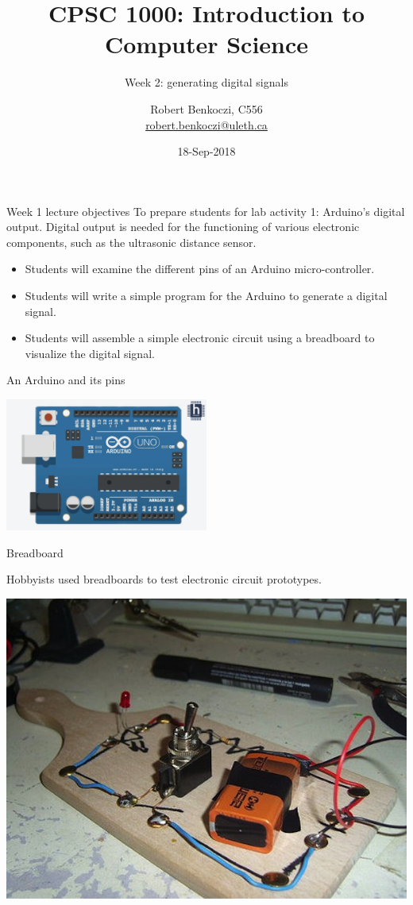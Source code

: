 \documentclass[aspectratio=1610]{beamer}
\title %
{CPSC 1000: Introduction to Computer Science}
\subtitle{Week 2: generating digital signals} %
\author{Robert Benkoczi, C556\\\url{robert.benkoczi@uleth.ca}}
\date{18-Sep-2018}
\begin{document}
\begin{frame}[plain]
\titlepage
\end{frame}


\begin{frame}[t,plain]{Week 1 lecture objectives}
To prepare students for lab activity 1: Arduino's digital
output. Digital output is needed for the functioning of various
electronic components, such as the ultrasonic distance sensor.

\begin{itemize}
\item Students will examine the different pins of an Arduino
  micro-controller. 
\item Students will write a simple program for the Arduino to generate
  a digital signal.
\item Students will assemble a simple electronic circuit using a
  breadboard to visualize the digital signal.
\end{itemize}
\end{frame}



\begin{frame}[plain]{An Arduino and its pins}

\begin{center}
\includegraphics[width=0.5\textwidth]{figs/1-arduino-simple.png}
\end{center}
\end{frame}



\begin{frame}[plain,t]{Breadboard}

  Hobbyists used breadboards to test electronic circuit prototypes.
 

\begin{center}
\includegraphics[width=.6\textwidth]{figs/1-bread.jpg}
\end{center}
\end{frame}
\end{document}

